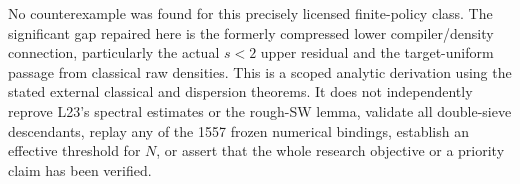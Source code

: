 No counterexample was found for this precisely licensed finite-policy
class. The significant gap repaired here is the formerly compressed
lower compiler/density connection, particularly the actual \(s<2\)
upper residual and the target-uniform passage from classical raw
densities. This is a scoped analytic derivation using the stated
external classical and dispersion theorems. It does not independently
reprove L23's spectral estimates or the rough-SW lemma, validate all
double-sieve descendants, replay any of the 1557 frozen numerical
bindings, establish an effective threshold for \(N\), or assert that
the whole research objective or a priority claim has been verified.
